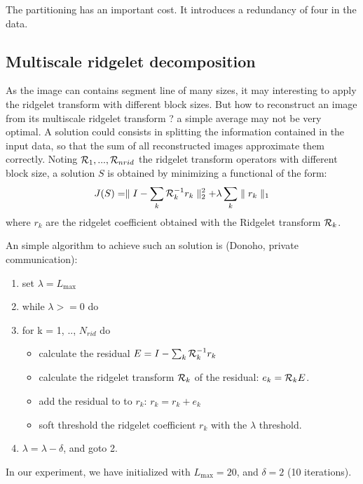 \documentclass[11pt,a4paper]{article}
\begin{document}
The partitioning has an important cost. It introduces a redundancy of four 
in the data.


\subsection{Multiscale ridgelet decomposition}
\label{sect_multi_rid}
As the image can contains segment line of many sizes, it may interesting
to apply the ridgelet transform with different block sizes. But how
to reconstruct an image from its multiscale ridgelet transform ?
a simple average may not be very optimal. A solution could consists in
splitting the information contained in the input data, so that the 
sum of all reconstructed images approximate them correctly. Noting
${\cal R}_1, ..., {\cal R}_{nrid}$ the ridgelet transform operators with
different block size, a solution $S$  
is obtained by minimizing a functional of the form:
\begin{eqnarray}
J(S) = \parallel I - \sum_k {\cal R}_k^{-1} r_k  \parallel_2^2 + \lambda \sum_k \parallel r_k \parallel_1
\label{eqn_min_decomp}
\end{eqnarray}
where $r_k$ are the ridgelet coefficient obtained with the Ridgelet 
transform ${\cal R}_k$.

An simple algorithm to achieve such an solution 
is (Donoho, private communication):
\begin{enumerate}
\item set $\lambda = L_{\max}$
\item while $\lambda >= 0$ do
\item for k = 1, .., $N_{rid}$ do
\begin{itemize}
\item calculate the residual $E = I - \sum_k {\cal R}_k^{-1} r_k$
\item calculate the ridgelet transform ${\cal R}_k$ of the residual:
$e_k = {\cal R}_k E$.
\item add the residual to to $r_k$:  $r_k = r_k + e_k$
\item soft threshold the ridgelet coefficient $r_k$ with the 
$\lambda$ threshold.
\end{itemize}
\item $\lambda = \lambda - \delta$, and goto 2.
\end{enumerate}
In our experiment, we have initialized with $L_{\max} = 20$, and 
$\delta = 2$ (10 iterations).
\end{document}
